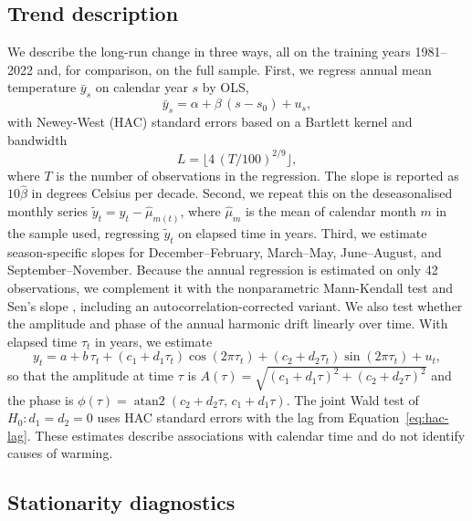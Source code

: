 \documentclass[11pt]{article}
\begin{document}
\subsection{Trend description}

We describe the long-run change in three ways, all on the training years 1981--2022 and, for comparison, on the full sample. First, we regress annual mean temperature $\bar y_s$ on calendar year $s$ by OLS,
\begin{equation}\label{eq:trend-annual}
  \bar y_s = \alpha + \beta\,(s - s_0) + u_s ,
\end{equation}
with Newey-West (HAC) standard errors based on a Bartlett kernel and bandwidth
\begin{equation}\label{eq:hac-lag}
  L = \bigl\lfloor 4\,(T/100)^{2/9} \bigr\rfloor ,
\end{equation}
where $T$ is the number of observations in the regression. The slope is reported as $10\hat\beta$ in degrees Celsius per decade. Second, we repeat this on the deseasonalised monthly series $\tilde y_t = y_t - \hat\mu_{m(t)}$, where $\hat\mu_m$ is the mean of calendar month $m$ in the sample used, regressing $\tilde y_t$ on elapsed time in years. Third, we estimate season-specific slopes for December--February, March--May, June--August, and September--November. Because the annual regression is estimated on only 42 observations, we complement it with the nonparametric Mann-Kendall test \citep{mann1945nonparametric} and Sen's slope \citep{sen1968estimates}, including an autocorrelation-corrected variant. We also test whether the amplitude and phase of the annual harmonic drift linearly over time. With elapsed time $\tau_t$ in years, we estimate
\begin{equation}\label{eq:drift}
  y_t = a + b\,\tau_t + (c_1 + d_1\tau_t)\cos(2\pi\tau_t) + (c_2 + d_2\tau_t)\sin(2\pi\tau_t) + u_t ,
\end{equation}
so that the amplitude at time $\tau$ is $A(\tau)=\sqrt{(c_1+d_1\tau)^2+(c_2+d_2\tau)^2}$ and the phase is $\phi(\tau)=\operatorname{atan2}(c_2+d_2\tau,\,c_1+d_1\tau)$. The joint Wald test of $H_0\colon d_1=d_2=0$ uses HAC standard errors with the lag from Equation~\eqref{eq:hac-lag}. These estimates describe associations with calendar time and do not identify causes of warming.

\subsection{Stationarity diagnostics}
\end{document}
